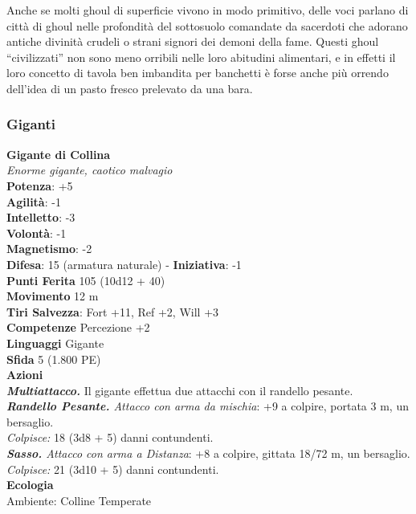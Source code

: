 \begin{multicols}{2}
Anche se molti ghoul di superficie vivono in modo primitivo, delle voci parlano di città di ghoul nelle profondità del sottosuolo comandate da sacerdoti che adorano antiche divinità crudeli o strani signori dei demoni della fame. Questi ghoul “civilizzati” non sono meno orribili nelle loro abitudini alimentari, e in effetti il loro concetto di tavola ben imbandita per banchetti è forse anche più orrendo dell’idea di un pasto fresco prelevato da una bara.\\

\subsubsection{Giganti}

\medskip\textbf{Gigante di Collina}\\
\emph{Enorme gigante, caotico malvagio}\\
\textbf{Potenza}: +5\\
\textbf{Agilità}: -1\\
\textbf{Intelletto}: -3\\
\textbf{Volontà}: -1\\
\textbf{Magnetismo}: -2\\
\textbf{Difesa}: 15 (armatura naturale) - \textbf{Iniziativa}: -1\\
\textbf{Punti Ferita} 105 (10d12 + 40)\\
\textbf{Movimento} 12 m\\
\textbf{Tiri Salvezza}: Fort +11, Ref +2, Will +3\\
\textbf{Competenze} Percezione +2\\
\textbf{Linguaggi} Gigante\\
\textbf{Sfida} 5 (1.800 PE)\smallskip\\
\smallskip\textbf{Azioni}\\
\emph{\textbf{Multiattacco.}} Il gigante effettua due attacchi con il randello pesante.\\
\emph{\textbf{Randello Pesante.} Attacco con arma da mischia}: +9 a colpire, portata 3 m, un bersaglio.\\
\emph{Colpisce:} 18 (3d8 + 5) danni contundenti.\\
\emph{\textbf{Sasso.} Attacco con arma a Distanza}: +8 a colpire, gittata 18/72 m, un bersaglio.\\
\emph{Colpisce:} 21 (3d10 + 5) danni contundenti.\\
\textbf{Ecologia}\\
Ambiente: Colline Temperate\\

\end{multicols}
